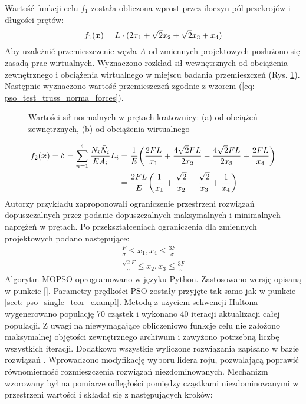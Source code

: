 Wartość funkcji celu $f_1$ została obliczona wprost przez iloczyn pól przekrojów i długości prętów:
\begin{equation}
	f_1(\bm{x}) = L\cdot(2x_1+\sqrt{2}x_2+\sqrt{2}x_3+x_4)
\end{equation}
Aby uzależnić przemieszczenie węzła $A$ od zmiennych projektowych posłużono się zasadą prac wirtualnych. Wyznaczono rozkład sił wewnętrznych od obciążenia zewnętrznego i obciążenia wirtualnego w miejscu badania przemieszczeń (Rys. \ref{fig: pso_testtruss_results}). Następnie wyznaczono wartość przemieszczeń zgodnie z wzorem (\ref{eq: pso_test_truss_norma_forces}).
\begin{figure}[h]
	\centering
	\captionsetup{justification=centering}
	\caption{Wartości sił normalnych w prętach kratownicy: (a) od obciążeń zewnętrznych, (b) od obciążenia wirtualnego}
	\label{fig: pso_testtruss_results}
\end{figure}
\begin{equation} \label{eq: pso_test_truss_norma_forces}
\begin{split}
	f_2(\bm{x}) =\delta= \sum_{n=1}^{4} \frac{N_i\bar{N}_i}{EA_i}L_i &=\frac{1}{E}\bigg(\frac{2FL}{x_1}+ \frac{4\sqrt{2}FL}{2x_2}- \frac{4\sqrt{2}FL}{2x_3}+\frac{2FL}{x_4}\bigg) \\
	&=\frac{2FL}{E}\bigg(\frac{1}{x_1}+\frac{\sqrt{2}}{x_2}-\frac{\sqrt{2}}{x_3}+\frac{1}{x_4}\bigg)
\end{split}
\end{equation}
Autorzy przykładu zaproponowali ograniczenie przestrzeni rozwiązań dopuszczalnych przez podanie dopuszczalnych maksymalnych i minimalnych naprężeń w prętach. Po przekształceniach ograniczenia dla zmiennych projektowych podano następujące:
\begin{equation}
	\begin{split}
	\frac{F}{\sigma} \le x_1,x_4 \le \frac{3F}{\sigma}\\
	\frac{\sqrt{2}F}{\sigma} \le x_2,x_3 \le \frac{3F}{\sigma}
	\end{split}
\end{equation}
Algorytm MOPSO oprogramowano w języku Python. Zastosowano wersję opisaną w punkcie \ref{}. Parametry prędkości PSO zostały przyjęte tak samo jak w punkcie \ref{sect: pso_single_teor_exampl}. Metodą z użyciem sekwencji Haltona wygenerowano populację 70 cząstek i wykonano 40 iteracji aktualizacji całej populacji. Z uwagi na niewymagające obliczeniowo funkcje celu nie założono maksymalnej objętości zewnętrznego archiwum i zawyżono potrzebną liczbę wszystkich iteracji. Dodatkowo wszystkie wyliczone rozwiązania zapisano w bazie rozwiązań . Wprowadzono modyfikację wyboru lidera roju, pozwalającą poprawić równomierność rozmieszczenia rozwiązań niezdominowanych. Mechanizm wzorowany był na pomiarze odległości pomiędzy cząstkami niezdominowanymi w przestrzeni wartości \parencite{Deb2002} i składał się z następujących kroków:
